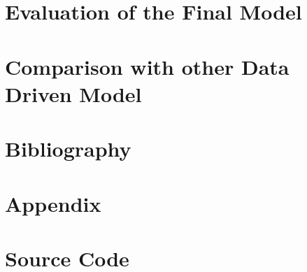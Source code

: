 \documentclass[10pt, a4paper]{article}
\begin{document}
\newpage
\section{Evaluation of the Final Model}

\newpage
\section{Comparison with other Data Driven Model}

\newpage
\section{Bibliography}




\newpage
\section{Appendix}
\appendix
\section{Source Code}
\subsection{}
\end{document}
